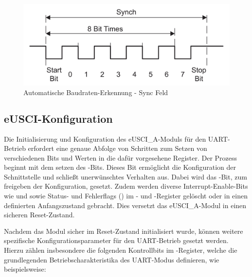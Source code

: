 \begin{figure}[h!]
	\centering
	\includegraphics[width=1.0\textwidth]{../Bilder/sync_field.png}
	\caption{Automatische Baudraten-Erkennung - Sync Feld\\}
	\label{fig:sync_field}
\end{figure}

\newpage
\subsection{eUSCI-Konfiguration}
\label{sec:eUSCI_Konfiguration}

Die Initialisierung und Konfiguration des eUSCI\_A-Moduls f\"ur den UART-Betrieb erfordert eine genaue Abfolge von Schritten zum Setzen von verschiedenen Bits und Werten in die daf\"ur vorgesehene Register. Der Prozess beginnt mit dem setzen des -Bits. Dieses Bit erm\"oglicht die Konfiguration der Schnittstelle und schließt unerw\"unschtes Verhalten aus. Dabei wird das -Bit, zum freigeben der Konfiguration, gesetzt. Zudem werden diverse Interrupt-Enable-Bits wie  und  sowie Status- und Fehlerflags () im - und -Register gel\"oscht oder in einen definierten Anfangszustand gebracht. Dies versetzt das eUSCI\_A-Modul in einen sicheren Reset-Zustand.

Nachdem das Modul sicher im Reset-Zustand initialisiert wurde, k\"onnen weitere spezifische Konfigurationsparameter f\"ur den UART-Betrieb gesetzt werden. Hierzu z\"ahlen insbesondere die folgenden Kontrollbits im -Register, welche die grundlegenden Betriebscharakteristika des UART-Modus definieren, wie beispielsweise:

